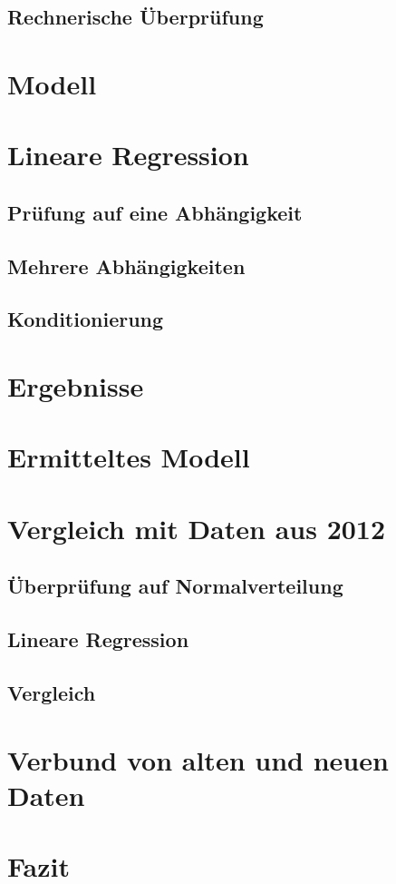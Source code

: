 \subsection{Rechnerische Überprüfung}

\section{Modell}
\section{Lineare Regression}
\subsection{Prüfung auf eine Abhängigkeit}
\subsection{Mehrere Abhängigkeiten}
\subsection{Konditionierung}

\section{Ergebnisse}
\section{Ermitteltes Modell}

\section{Vergleich mit Daten aus 2012}
\subsection{Überprüfung auf Normalverteilung}
\subsection{Lineare Regression}
\subsection{Vergleich}

\section{Verbund von alten und neuen Daten}

\section{Fazit}

